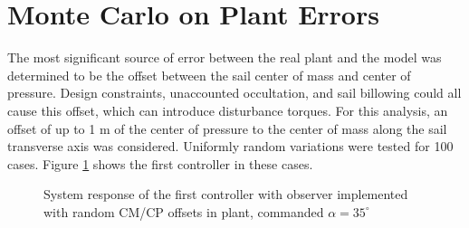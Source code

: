 \documentclass[]{aiaa-tc}%
\begin{document}
	\section{Monte Carlo on Plant Errors}

	The most significant source of error between the real plant and the model was determined to be the offset between the sail center of mass and center of pressure\cite{WieSolarSail2}. Design constraints, unaccounted occultation, and sail billowing could all cause this offset, which can introduce disturbance torques. For this analysis, an offset of up to 1 m of the center of pressure to the center of mass along the sail transverse axis was considered.  Uniformly random variations were tested for 100 cases. Figure \ref{fig:Ctrl1MC} shows the first controller in these cases.

	\begin{figure}[H]
		\centering
		\caption{System response of the first controller with observer implemented with random CM/CP offsets in plant, commanded $\alpha=35^{\circ}$ }
		\label{fig:Ctrl1MC}
	\end{figure}	
\end{document}
